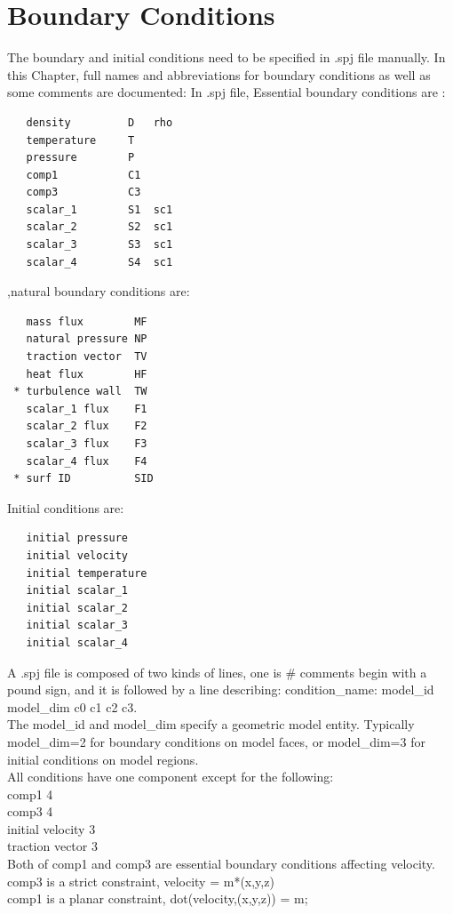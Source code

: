 \documentclass{article}
\begin{document}
\pagebreak

\section{Boundary Conditions}

The boundary and initial conditions need to be specified in .spj file manually. In this Chapter, full names and abbreviations for boundary conditions as well as some comments are documented:
In .spj file, Essential boundary conditions are :
  \begin{lstlisting}
   density         D   rho
   temperature     T
   pressure        P
   comp1           C1
   comp3           C3
   scalar_1        S1  sc1
   scalar_2        S2  sc1
   scalar_3        S3  sc1
   scalar_4        S4  sc1
  \end{lstlisting}
,natural boundary conditions are:
  \begin{lstlisting}
   mass flux        MF
   natural pressure NP
   traction vector  TV
   heat flux        HF
 * turbulence wall  TW
   scalar_1 flux    F1
   scalar_2 flux    F2
   scalar_3 flux    F3
   scalar_4 flux    F4
 * surf ID          SID
  \end{lstlisting}
   Initial conditions are:
  \begin{lstlisting}
   initial pressure
   initial velocity
   initial temperature
   initial scalar_1
   initial scalar_2
   initial scalar_3
   initial scalar_4
  \end{lstlisting}
   A .spj file is composed of two kinds of lines, one is \# comments begin with a pound sign, and it is followed by a line describing: condition\_name: model\_id model\_dim c0 c1 c2 c3. \\
   The model\_id and model\_dim specify a geometric model entity. Typically model\_dim=2 for boundary conditions on model faces, or model\_dim=3 for initial conditions on model regions.\\
   All conditions have one component except for the following:\\
   comp1            4 \\
   comp3            4 \\
   initial velocity 3 \\
   traction vector  3 \\
   Both of comp1 and comp3 are essential boundary conditions affecting velocity. \\
   comp3 is a strict constraint, velocity = m*(x,y,z) \\
   comp1 is a planar constraint, dot(velocity,(x,y,z)) = m; \\
\end{document}
